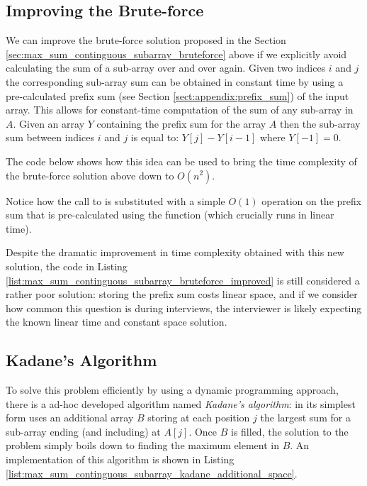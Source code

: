 \subsection{Improving the Brute-force}
\label{max_sum_continguous_subarray:sec:bruteforce_improved}
We can improve the brute-force solution proposed in the Section \ref{sec:max_sum_continguous_subarray_bruteforce} above if we explicitly avoid calculating the sum of a sub-array over and over again.
Given two indices $i$ and $j$ the corresponding sub-array sum can be obtained in constant time by using a pre-calculated prefix sum (see Section \ref{sect:appendix:prefix_sum}) of the input array.
This allows for constant-time computation of the sum of any sub-array in $A$. Given an array $Y$ containing the prefix sum for the
array $A$ then the sub-array sum between indices $i$ and $j$ is equal to: $Y[j]-Y[i-1]$ where $Y[-1] = 0$.

The code below shows how this idea can be used to bring the time complexity of the brute-force solution above down to $O(n^2)$. 

Notice how the call to  is substituted with a simple $O(1)$ operation on the prefix sum that is pre-calculated using the function  (which crucially runs in linear time).




Despite the dramatic improvement in time complexity obtained with this new solution, the code in Listing
\ref{list:max_sum_continguous_subarray_bruteforce_improved} is still considered a rather poor solution:
storing the prefix sum costs linear space, and  if we consider how common this question is during interviews, the interviewer is likely expecting the known linear time and constant space solution.

\subsection{Kadane's Algorithm}
\label{sec:kadane_algorithm}
To solve this problem efficiently by using a dynamic programming approach, there is a ad-hoc developed algorithm named \textit{Kadane’s algorithm}: in its simplest form uses an additional array $B$ storing at each position $j$ the largest sum for a sub-array ending (and including) at $A[j]$.
Once $B$ is filled, the solution to the problem simply boils down to finding the maximum element in $B$.
An implementation of this algorithm is shown 
in Listing \ref{list:max_sum_continguous_subarray_kadane_additional_space}.

